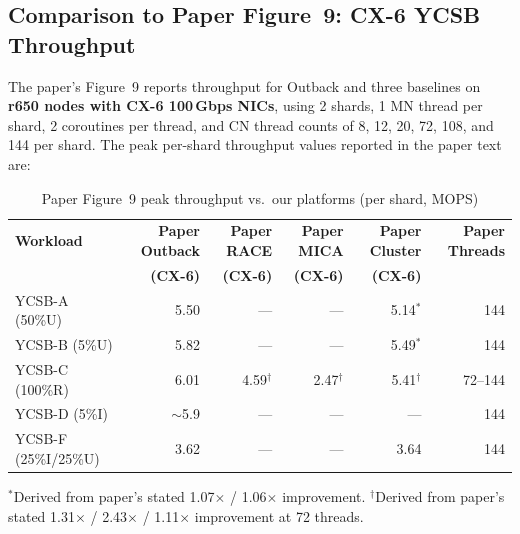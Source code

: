 \documentclass[11pt,a4paper]{article}
\begin{document}
\subsection{Comparison to Paper Figure~9: CX-6 YCSB Throughput}

The paper's Figure~9 reports throughput for Outback and three baselines on \textbf{r650 nodes with CX-6 100\,Gbps NICs}, using 2 shards, 1 MN thread per shard, 2 coroutines per thread, and CN thread counts of 8, 12, 20, 72, 108, and 144 per shard. The peak per-shard throughput values reported in the paper text are:

\begin{table}[H]
\centering
\caption{Paper Figure~9 peak throughput vs.\ our platforms (per shard, MOPS)}
\label{tab:paper-fig9}
\small
\begin{tabular}{@{}lrrrrr@{}}
\toprule
\textbf{Workload} & \textbf{Paper Outback} & \textbf{Paper RACE} & \textbf{Paper MICA} & \textbf{Paper Cluster} & \textbf{Paper Threads} \\
 & \textbf{(CX-6)} & \textbf{(CX-6)} & \textbf{(CX-6)} & \textbf{(CX-6)} & \\
\midrule
YCSB-A (50\%U) & 5.50 & --- & --- & 5.14$^*$ & 144 \\
YCSB-B (5\%U)  & 5.82 & --- & --- & 5.49$^*$ & 144 \\
YCSB-C (100\%R) & 6.01 & 4.59$^\dagger$ & 2.47$^\dagger$ & 5.41$^\dagger$ & 72--144 \\
YCSB-D (5\%I)   & $\sim$5.9 & --- & --- & --- & 144 \\
YCSB-F (25\%I/25\%U) & 3.62 & --- & --- & 3.64 & 144 \\
\bottomrule
\end{tabular}

\vspace{2pt}
{\scriptsize $^*$Derived from paper's stated 1.07$\times$ / 1.06$\times$ improvement.
$^\dagger$Derived from paper's stated 1.31$\times$ / 2.43$\times$ / 1.11$\times$ improvement at 72 threads.}
\end{table}
\end{document}
